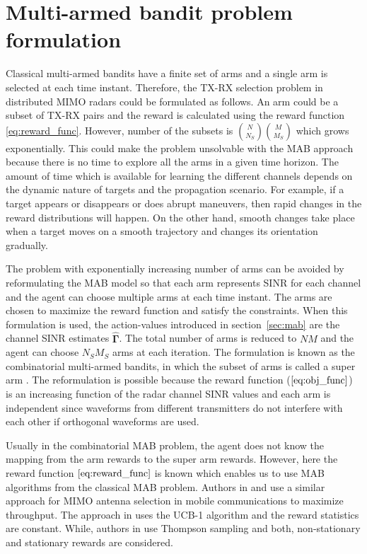 \documentclass[conference]{IEEEtran}
\newcommand{\vsinrb}{\widehat{\boldsymbol{\Gamma}}}
\begin{document}
\section{Multi-armed bandit problem formulation}
\label{sec:fmab}

Classical multi-armed bandits have a finite set of arms and a single arm is selected at each time instant.
Therefore, the TX-RX selection problem in distributed MIMO radars could be formulated as follows.
An arm could be a subset of TX-RX pairs and the reward is calculated using the reward function \eqref{eq:reward_func}.
However, number of the subsets is $\binom{N}{N_S}\binom{M}{M_S}$ which grows exponentially. This could make the problem unsolvable with the MAB approach because there is no time to explore all the arms in a given time horizon.
The amount of time which is available for learning the different channels depends on the dynamic nature of targets and the propagation scenario.
For example, if a target appears or disappears or does abrupt maneuvers, then rapid changes in the reward distributions will happen. 
On the other hand, smooth changes take place when a target moves on a smooth trajectory and changes its orientation gradually.

The problem with exponentially increasing number of arms can be avoided by reformulating the MAB model so that each arm represents SINR for each channel and the agent can choose multiple arms at each time instant.
The arms are chosen to maximize the reward function and satisfy the constraints.
When this formulation is used, the action-values introduced in section~\ref{sec:mab} are the channel SINR estimates $\vsinrb$.
The total number of arms is reduced to $NM$ and the agent can choose $N_S M_S$ arms at each iteration.
The formulation is known as the combinatorial multi-armed bandits, in which the subset of arms is called a super arm \cite{Chen2014}.
The reformulation is possible because the reward function ($\ref{eq:obj_func}$) is an increasing function of the radar channel SINR values and each arm is independent since waveforms from different transmitters do not interfere with each other if orthogonal waveforms are used.

Usually in the combinatorial MAB problem, the agent does not know the mapping from the arm rewards to the super arm rewards.
However, here the reward function $\eqref{eq:reward_func}$ is known which enables us to use MAB algorithms from the classical MAB problem.
Authors in \cite{Mukherjee2012} and \cite{Kuai2019} use a similar approach for MIMO antenna selection in mobile communications to maximize throughput.
The approach in \cite{Mukherjee2012} uses the UCB-1 algorithm and the reward statistics are constant.
While, authors in \cite{Kuai2019} use Thompson sampling and both, non-stationary and stationary rewards are considered.
\end{document}
